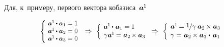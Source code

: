 \begin{otherlanguage}{russian}
Для, к~примеру, первого вектора кобазиса~${\bm{a}^{\hspace{-0.1ex}1}\hspace{-0.1ex}}$

\nopagebreak\vspace{-0.1em}\begin{equation*}
\scalebox{0.9}[0.9]{$\left\{\hspace{-0.16em}\begin{array}{l}
\bm{a}^{\hspace{-0.1ex}1} \hspace{-0.1ex} \dotp \bm{a}_{1} = 1 \\
\bm{a}^{\hspace{-0.1ex}1} \hspace{-0.1ex} \dotp \bm{a}_{2} = 0 \\
\bm{a}^{\hspace{-0.1ex}1} \hspace{-0.1ex} \dotp \bm{a}_{3} = 0 \\[0.05em]
\end{array}\right.$} \,\Rightarrow\hspace{0.32em}
%
\scalebox{0.92}[0.92]{$\left\{\hspace{-0.12em}\begin{array}{l}
\bm{a}^{\hspace{-0.1ex}1} \hspace{-0.1ex} \dotp \hspace{0.2ex} \bm{a}_{1} = 1 \\[0.1em]
\gamma \hspace{0.1ex} \bm{a}^{\hspace{-0.1ex}1} \hspace{-0.1ex} = \hspace{0.1ex} \bm{a}_2 \hspace{-0.1ex} \times \bm{a}_3 \\[0.08em]
\end{array}\right.$} \Rightarrow\hspace{0.32em}
%
\scalebox{0.96}[0.96]{$\left\{\hspace{-0.11em}\begin{array}{l}
\bm{a}^{\hspace{-0.1ex}1} \hspace{-0.2ex} =
\displaystyle \nicefrac{\scalebox{0.95}{$1$}\hspace{0.1ex}}{\scalebox{1.02}{$\gamma$}} \hspace{0.5ex} \bm{a}_2 \hspace{-0.1ex} \times \bm{a}_3 \hspace{0.1ex} \\[0.08em]
\gamma = \hspace{0.1ex} \bm{a}_2 \hspace{-0.1ex} \times \bm{a}_3 \hspace{0.1ex} \dotp \hspace{0.25ex} \bm{a}_{1} \\[0.08em]
\end{array}\right.$}
\end{equation*}


\end{otherlanguage}
